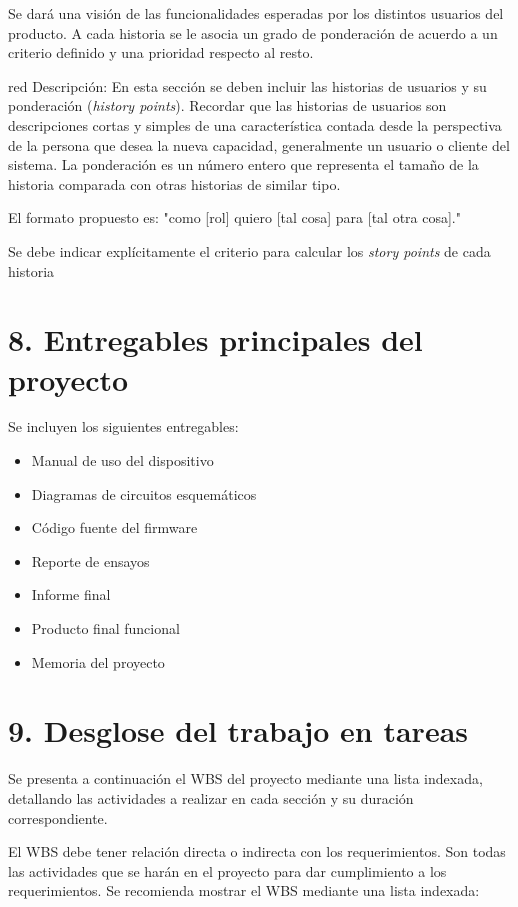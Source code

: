 \documentclass[
11pt, %
codirector, %
]{charter}
\begin{document}
Se dará una visión de las funcionalidades esperadas por los distintos usuarios del producto. A cada
historia se le asocia un grado de ponderación de acuerdo a un criterio definido y una prioridad
respecto al resto.

\begin{consigna}{red}
Descripción: En esta sección se deben incluir las historias de usuarios y su ponderación (\textit{history points}). Recordar que las historias de usuarios son descripciones cortas y simples de una característica contada desde la perspectiva de la persona que desea la nueva capacidad, generalmente un usuario o cliente del sistema. La ponderación es un número entero que representa el tamaño de la historia comparada con otras historias de similar tipo.

El formato propuesto es: "como [rol] quiero [tal cosa] para [tal otra cosa]."

Se debe indicar explícitamente el criterio para calcular los \textit{story points} de cada historia
\end{consigna}

\section{8. Entregables principales del proyecto}
\label{sec:entregables}

Se incluyen los siguientes entregables:

\begin{itemize}
	\item Manual de uso del dispositivo
	\item Diagramas de circuitos esquemáticos
	\item Código fuente del firmware
	\item Reporte de ensayos
	\item Informe final
	\item Producto final funcional
	\item Memoria del proyecto
\end{itemize}

\section{9. Desglose del trabajo en tareas}
\label{sec:wbs}

Se presenta a continuación el WBS del proyecto mediante una lista indexada, detallando las actividades a realizar en cada sección y su duración correspondiente.

El WBS debe tener relación directa o indirecta con los requerimientos.  Son todas las actividades que se harán en el proyecto para dar cumplimiento a los requerimientos. Se recomienda mostrar el WBS mediante una lista indexada:
\end{document}
